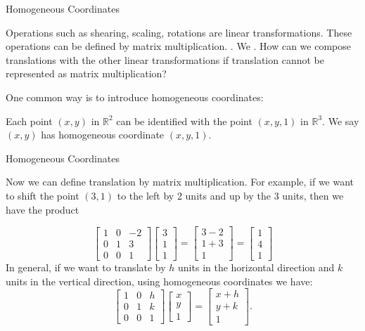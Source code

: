 \documentclass[xcoler=dvipsnames, aspectratio=169]{beamer}
\begin{document}
\begin{frame}{Homogeneous Coordinates}

\bi
\pause\ii Operations such as shearing, scaling, rotations are \alert{linear transformations}. 
\bi
\pause\ii [$\circ$] These operations can be defined by \alert{matrix multiplication}.
\ei
\pause\ii {}. We .
\pause\ii How can we compose translations with the other linear transformations if translation cannot be represented as matrix multiplication?
\ei

\pause
\bbox
One common way is to introduce \alert{homogeneous coordinates}:

\bi 
\pause\ii Each point $(x,y)$ in $\mathbb{R}^2$ can be identified with the point $(x,y,1)$ in $\mathbb{R}^3$.
\pause\ii We say $(x,y)$ has homogeneous coordinate $(x,y,1)$.
\ei
\ebox

\end{frame}

\begin{frame}{Homogeneous Coordinates}

Now we can define translation by matrix multiplication. For example, if we want to shift the point $(3,1)$ to the left by 2 units and up by the 3 units, then we have the product

\[ \begin{bmatrix}1 & 0 & -2\\ 0 & 1 & 3 \\ 0 & 0 & 1\end{bmatrix} \begin{bmatrix}3 \\ 1\\ 1 \end{bmatrix} = \begin{bmatrix} 3-2 \\ 1+3 \\ 1 \end{bmatrix} = \begin{bmatrix}1\\4\\1 \end{bmatrix}\]
    \pause
\bbox
In general, if we want to translate by $h$ units in the horizontal direction and $k$ units in the vertical direction, using homogeneous coordinates we have:
\pause
\[ \begin{bmatrix} 1 & 0 & h \\ 0 & 1 & k \\ 0 & 0 & 1 \end{bmatrix} \begin{bmatrix}x \\ y \\ 1 \end{bmatrix} = \begin{bmatrix} x+h \\ y+k \\ 1 \end{bmatrix}.\]
\ebox

\end{frame}
\end{document}
